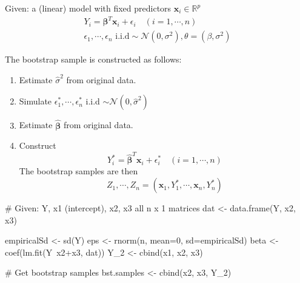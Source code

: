  \begin{theory}
  Given: a (linear) model with fixed predictors $\mathbf{x}_i \in \mathbb{R}^p$
  \begin{gather*}
      Y_i = \boldsymbol{\beta}^T \mathbf{x}_i + \epsilon_i \quad (i = 1, \cdots, n) \\
     \epsilon_1, \cdots, \epsilon_n \text{ i.i.d} \sim \mathcal{N}(0, \sigma^2), \theta = (\beta, \sigma^2)
  \end{gather*}

  The bootstrap sample is constructed as follows:
  \begin{enumerate}
   \item Estimate $\hat{\sigma}^2$ from original data.
   \item Simulate $\epsilon_1^{\ast}, \cdots, \epsilon_n^{\ast}$ i.i.d $\sim \mathcal{N}(0, \hat{\sigma}^2)$
   \item Estimate $\boldsymbol{\hat{\beta}}$ from original data.
   \item Construct
         \begin{equation*}
             Y_i^{\ast} = \boldsymbol{\hat{\beta}}^T \mathbf{x}_i + \epsilon^{\ast}_i \quad (i = 1, \cdots, n)
         \end{equation*}
         The bootstrap samples are then
         \begin{equation*}
          Z_1, \cdots, Z_n = (\mathbf{x}_1, Y_1^{\ast}, \cdots, \mathbf{x}_n, Y_n^{\ast})
         \end{equation*}
  \end{enumerate}
 \end{theory}
 
 \begin{code}
  # Given: Y, x1 (intercept), x2, x3 all n x 1 matrices
  dat <- data.frame(Y, x2, x3)
  
  empiricalSd <- sd(Y)
  eps <- rnorm(n, mean=0, sd=empiricalSd)
  beta <- coef(lm.fit(Y~x2+x3, dat))
  Y_2 <- cbind(x1, x2, x3) %
  
  # Get bootstrap samples
  bst.samples <- cbind(x2, x3, Y_2)
 \end{code}
